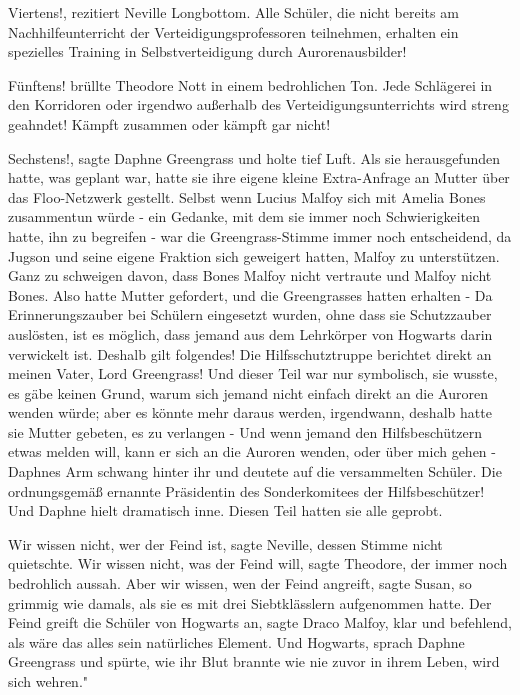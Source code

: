 \glqq Viertens!\grqq{}, rezitiert Neville Longbottom. \glqq Alle Schüler, die
nicht bereits am Nachhilfeunterricht der Verteidigungsprofessoren teilnehmen,
erhalten ein spezielles Training in Selbstverteidigung durch
Aurorenausbilder!\grqq{}

\glqq Fünftens!\grqq{} brüllte Theodore Nott in einem bedrohlichen Ton. \glqq
Jede Schlägerei in den Korridoren oder irgendwo außerhalb des
Verteidigungsunterrichts wird streng geahndet! Kämpft zusammen oder kämpft gar
nicht!\grqq{}

\glqq Sechstens!\grqq{}, sagte Daphne Greengrass und holte tief Luft. Als sie
herausgefunden hatte, was geplant war, hatte sie ihre eigene kleine
Extra-Anfrage an Mutter über das Floo-Netzwerk gestellt. Selbst wenn Lucius
Malfoy sich mit Amelia Bones zusammentun würde - ein Gedanke, mit dem sie immer
noch Schwierigkeiten hatte, ihn zu begreifen - war die Greengrass-Stimme immer
noch entscheidend, da Jugson und seine eigene Fraktion sich geweigert hatten,
Malfoy zu unterstützen. Ganz zu schweigen davon, dass Bones Malfoy nicht
vertraute und Malfoy nicht Bones. Also hatte Mutter gefordert, und die
Greengrasses hatten erhalten - \glqq Da Erinnerungszauber bei Schülern
eingesetzt wurden, ohne dass sie Schutzzauber auslösten, ist es möglich, dass
jemand aus dem Lehrkörper von Hogwarts darin verwickelt ist. Deshalb gilt
folgendes! Die Hilfsschutztruppe berichtet direkt an meinen Vater, Lord
Greengrass!\grqq{} Und dieser Teil war nur symbolisch, sie wusste, es gäbe
keinen Grund, warum sich jemand nicht einfach direkt an die Auroren wenden
würde; aber es könnte mehr daraus werden, irgendwann, deshalb hatte sie Mutter
gebeten, es zu verlangen - \glqq Und wenn jemand den Hilfsbeschützern etwas
melden will, kann er sich an die Auroren wenden, oder über mich gehen -\grqq{}
Daphnes Arm schwang hinter ihr und deutete auf die versammelten Schüler. \glqq
Die ordnungsgemäß ernannte Präsidentin des Sonderkomitees der
Hilfsbeschützer!\grqq{} Und Daphne hielt dramatisch inne. Diesen Teil hatten sie
alle geprobt.

\glqq Wir wissen nicht, wer der Feind ist\grqq{}, sagte Neville, dessen Stimme
nicht quietschte. \glqq Wir wissen nicht, was der Feind will\grqq{}, sagte
Theodore, der immer noch bedrohlich aussah. \glqq Aber wir wissen, wen der Feind
angreift\grqq{}, sagte Susan, so grimmig wie damals, als sie es mit drei
Siebtklässlern aufgenommen hatte. \glqq Der Feind greift die Schüler von
Hogwarts an\grqq{}, sagte Draco Malfoy, klar und befehlend, als wäre das alles
sein natürliches Element. \glqq Und Hogwarts\grqq{}, sprach Daphne Greengrass
und spürte, wie ihr Blut brannte wie nie zuvor in ihrem Leben, \glqq wird sich
wehren."


